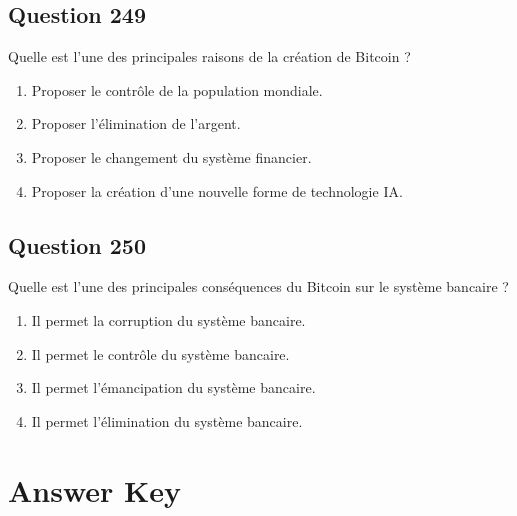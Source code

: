 \documentclass[12pt,a4paper]{article}
\begin{document}
\bigskip


\subsection*{Question 249}
Quelle est l'une des principales raisons de la création de Bitcoin ?

\begin{enumerate}[label=\Alph*., leftmargin=*]
\item Proposer le contrôle de la population mondiale.
\item Proposer l'élimination de l'argent.
\item Proposer le changement du système financier.
\item Proposer la création d'une nouvelle forme de technologie IA.
\end{enumerate}

\bigskip


\subsection*{Question 250}
Quelle est l'une des principales conséquences du Bitcoin sur le système bancaire ?

\begin{enumerate}[label=\Alph*., leftmargin=*]
\item Il permet la corruption du système bancaire.
\item Il permet le contrôle du système bancaire.
\item Il permet l'émancipation du système bancaire.
\item Il permet l'élimination du système bancaire.
\end{enumerate}

\bigskip


\newpage
\section*{Answer Key}
\end{document}
